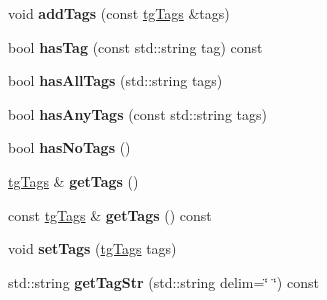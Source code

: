 \begin{DoxyCompactItemize}
\item 
\hypertarget{classtg_taggable_af28e3fe1a7e4eb28772dc006d575dd1f}{void {\bfseries add\-Tags} (const \hyperlink{classtg_tags}{tg\-Tags} \&tags)}\label{classtg_taggable_af28e3fe1a7e4eb28772dc006d575dd1f}

\item 
\hypertarget{classtg_taggable_ae31f65869c8887bfeb34a344902c4d5b}{bool {\bfseries has\-Tag} (const std\-::string tag) const }\label{classtg_taggable_ae31f65869c8887bfeb34a344902c4d5b}

\item 
\hypertarget{classtg_taggable_a33b77b1075171b63f673965687b2e844}{bool {\bfseries has\-All\-Tags} (std\-::string tags)}\label{classtg_taggable_a33b77b1075171b63f673965687b2e844}

\item 
\hypertarget{classtg_taggable_af14af28fa98021c4f20a5e8f2ddd5606}{bool {\bfseries has\-Any\-Tags} (const std\-::string tags)}\label{classtg_taggable_af14af28fa98021c4f20a5e8f2ddd5606}

\item 
\hypertarget{classtg_taggable_adff345e116e16420c701a748ff8f995f}{bool {\bfseries has\-No\-Tags} ()}\label{classtg_taggable_adff345e116e16420c701a748ff8f995f}

\item 
\hypertarget{classtg_taggable_acf1d7fa9df8f374f25015c4080902681}{\hyperlink{classtg_tags}{tg\-Tags} \& {\bfseries get\-Tags} ()}\label{classtg_taggable_acf1d7fa9df8f374f25015c4080902681}

\item 
\hypertarget{classtg_taggable_ae70d7d3b45301665bc363b0ed8b9b292}{const \hyperlink{classtg_tags}{tg\-Tags} \& {\bfseries get\-Tags} () const }\label{classtg_taggable_ae70d7d3b45301665bc363b0ed8b9b292}

\item 
\hypertarget{classtg_taggable_a5492888e4e4da4cca6261070b5726adf}{void {\bfseries set\-Tags} (\hyperlink{classtg_tags}{tg\-Tags} tags)}\label{classtg_taggable_a5492888e4e4da4cca6261070b5726adf}

\item 
\hypertarget{classtg_taggable_a346d66b066d2d9eb1eadba01da43749f}{std\-::string {\bfseries get\-Tag\-Str} (std\-::string delim=\char`\"{} \char`\"{}) const }\label{classtg_taggable_a346d66b066d2d9eb1eadba01da43749f}

\end{DoxyCompactItemize}
